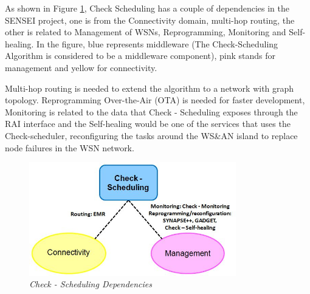 As shown in Figure \ref{fig:dep}, Check Scheduling has a couple of dependencies in the SENSEI project, one is from the Connectivity domain,
multi-hop routing, the other is related to Management of WSNs, Reprogramming, Monitoring and Self-healing. In the figure, blue
represents middleware (The Check-Scheduling Algorithm is considered to be a middleware component), pink stands for management and
yellow for connectivity. 

Multi-hop routing is needed to extend the algorithm to a network with graph topology. Reprogramming Over-the-Air (OTA) is needed for
faster development, Monitoring is related to the data that Check - Scheduling exposes through the RAI interface and the Self-healing would be
one of the services that uses the Check-scheduler, reconfiguring the tasks around the WS\&AN island to replace node failures in the WSN network.
\begin{figure}[ht]
\begin{center}
 \includegraphics[width=90mm]{static/check2.png}
\end{center}
\caption{\small \itshape{Check - Scheduling Dependencies}}
\label{fig:dep}
\end{figure}
